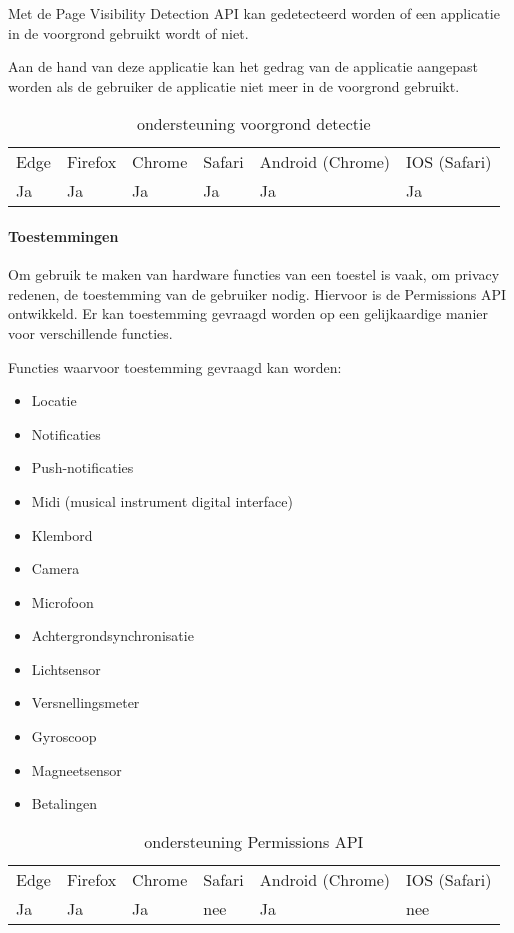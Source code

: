 Met de Page Visibility Detection API \autocite{Grigorik2020} kan gedetecteerd worden of een applicatie in de voorgrond gebruikt wordt of niet. 

Aan de hand van deze applicatie kan het gedrag van de applicatie aangepast worden als de gebruiker de applicatie niet meer in de voorgrond gebruikt.

\begin{table}[]
	\begin{tabular}{llllll}
		Edge & Firefox & Chrome & Safari & Android (Chrome) & IOS (Safari) \\
		Ja   & Ja      &  Ja     & Ja     & Ja               & Ja          
	\end{tabular}	
	\caption{ondersteuning voorgrond detectie }
	\label{ondersteuning voorgrond detectie}
\end{table}


\paragraph{Toestemmingen}

Om gebruik te maken van hardware functies van een toestel is vaak, om privacy redenen, de toestemming van de gebruiker nodig. Hiervoor is de Permissions API \autocite{Caceres2020} ontwikkeld. Er kan toestemming gevraagd worden op een gelijkaardige manier voor verschillende functies.

Functies waarvoor toestemming gevraagd kan worden:
 \begin{itemize}
	\item	Locatie
	\item	Notificaties
	\item	Push-notificaties
	\item	Midi (musical instrument digital interface)
	\item	Klembord
	\item	Camera
	\item	Microfoon
	\item	Achtergrondsynchronisatie
	\item	Lichtsensor
	\item	Versnellingsmeter
	\item	Gyroscoop
	\item	Magneetsensor
	\item	Betalingen
\end{itemize}

	\begin{table}[]
		\begin{tabular}{llllll}
			Edge & Firefox & Chrome & Safari & Android (Chrome) & IOS (Safari) \\
			Ja   & Ja      &  Ja     & nee     & Ja               & nee          
		\end{tabular}	
		\caption{ondersteuning Permissions API }
		\label{ondersteuning Permission API}
	\end{table}
	

